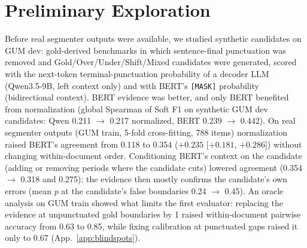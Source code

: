 
\section{Preliminary Exploration}
\label{app:prelim}
Before real segmenter outputs were available, we studied synthetic candidates on GUM dev: gold-derived benchmarks in which
sentence-final punctuation was removed and Gold/Over/Under/Shift/Mixed candidates were generated, scored with the
next-token terminal-punctuation probability of a decoder LLM (Qwen3.5-9B, left context only) and with BERT's
\texttt{[MASK]} probability (bidirectional context). BERT evidence was better, and only BERT benefited from
normalization (global Spearman of Soft F1 on synthetic GUM dev candidates: Qwen 0.211 $\to$ 0.217 normalized, BERT
0.239 $\to$ 0.442). On real segmenter outputs (GUM train, 5-fold cross-fitting, 788 items) normalization raised BERT's
agreement from 0.118 to 0.354 ($+0.235$ [$+0.181$, $+0.286$]) without changing within-document order. Conditioning
BERT's context on the candidate (adding or removing periods where the candidate cuts) lowered agreement (0.354 $\to$
0.318 and 0.275): the evidence then mostly confirms the candidate's own errors (mean $p$ at the candidate's false
boundaries 0.24 $\to$ 0.45). An oracle analysis on GUM train showed what limits the first evaluator: replacing the
evidence at unpunctuated gold boundaries by 1 raised within-document pairwise accuracy from 0.63 to 0.85, while fixing
calibration at punctuated gaps raised it only to 0.67 (App.~\ref{app:blindspots}).
